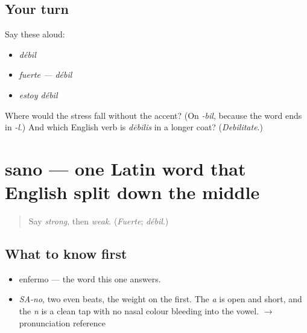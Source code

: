 \subsection*{Your turn}
Say these aloud:

\begin{itemize}
\raggedright
  \item \emph{débil}
  \item \emph{fuerte — débil}
  \item \emph{estoy débil}
\end{itemize}

\begin{tcolorbox}[breakable,colback=teal!4,colframe=teal!35!black,title={Before you move on}]
Where would the stress fall without the accent? (On \emph{-bil}, because the word ends in \emph{-l}.) And which English verb is \emph{dēbilis} in a longer coat? (\emph{Debilitate}.)
\end{tcolorbox}
\section[sano]{sano — one Latin word that English split down the middle}

\label{lesson:ES-C327-sano}



\begin{quote}
Say \emph{strong}, then \emph{weak}. (\emph{Fuerte}; \emph{débil}.)
\end{quote}

\subsection*{What to know first}
\begin{itemize}
\raggedright
  \item enfermo — the word this one answers.
\end{itemize}

\begin{sounds}
\begin{itemize}
\raggedright
  \item \emph{SA-no}, two even beats, the weight on the first. The \emph{a} is open and short, and the \emph{n} is a clean tap with no nasal colour bleeding into the vowel. $\to$ pronunciation reference
\end{itemize}
\end{sounds}

